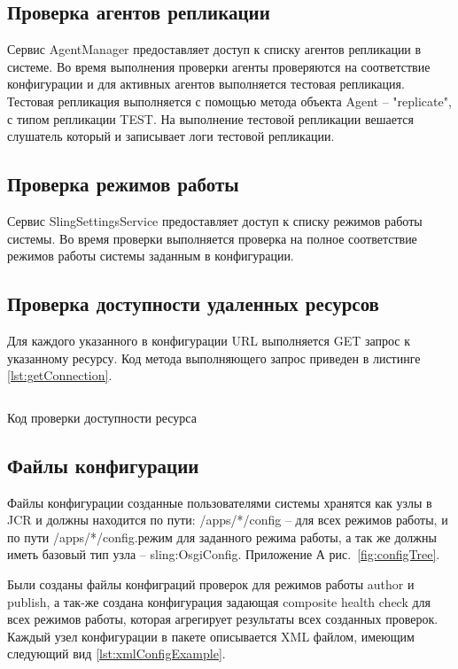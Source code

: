 \subsection{Проверка агентов репликации} 
Сервис AgentManager предоставляет доступ к списку агентов репликации в системе. Во время выполнения проверки агенты проверяются на соответствие конфигурации и для активных агентов выполняется тестовая репликация. Тестовая репликация выполняется с помощью метода объекта Agent – "replicate", с типом репликации TEST. На выполнение тестовой репликации вешается слушатель который и записывает логи тестовой репликации.

\subsection{Проверка режимов работы}
Сервис SlingSettingsService предоставляет доступ к списку режимов работы системы. Во время проверки выполняется проверка на полное соответствие режимов работы системы заданным в конфигурации.

\subsection{Проверка доступности удаленных ресурсов}
Для каждого указанного в конфигурации URL выполняется GET запрос к указанному ресурсу. Код метода выполняющего запрос приведен в листинге \ref{lst:getConnection}.

\begin{listing}[H]
\inputminted[linenos,frame=single]{java}{inc/src/getConnection}
\caption{Код проверки доступности ресурса} 
\label{lst:getConnection}
\end{listing}

\subsection{Файлы конфигурации}
Файлы конфигурации созданные пользователями системы хранятся как узлы в JCR и должны находится по пути: /apps/*/config – для всех режимов работы, и по пути /apps/*/config.{режим} для заданного режима работы, а так же должны иметь базовый тип узла – sling:OsgiConfig. Приложение А рис.~\ref{fig:configTree}.

Были созданы файлы конфиграций проверок для режимов работы author и publish, а так-же создана конфигурация задающая composite health check для всех режимов работы, которая агрегирует результаты всех созданных проверок. Каждый узел конфигурации в пакете описывается XML файлом, имеющим следующий вид \ref{lst:xmlConfigExample}.

